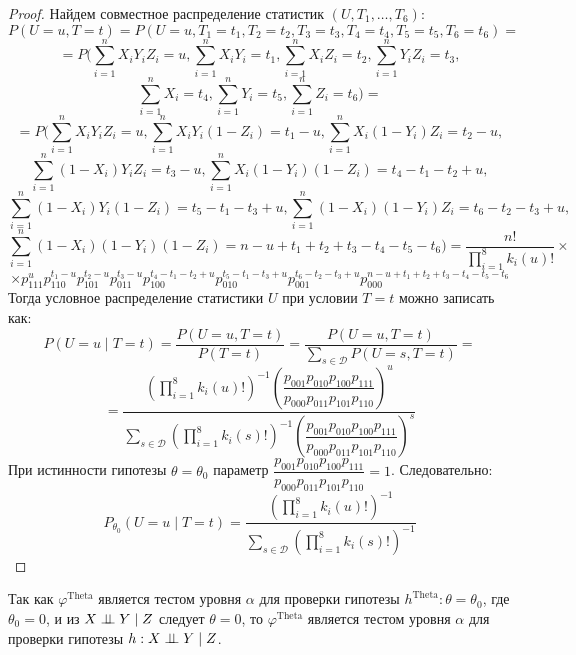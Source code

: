     \begin{proof}
        Найдем совместное распределение статистик $(U,T_1,\ldots,T_6)$:
        $$
            P(U=u,T=t)=P(U=u, T_1=t_1, T_2=t_2, T_3=t_3, T_4=t_4, T_5=t_5, T_6=t_6)=
        $$
        $$
            =P\biggl(\sum_{i=1}^n X_i Y_i Z_i=u, \sum_{i=1}^n X_i Y_i=t_1, \sum_{i=1}^n X_i Z_i=t_2,\sum_{i=1}^n Y_i Z_i=t_3,
            $$
            $$
            \sum_{i=1}^n X_i=t_4,\sum_{i=1}^n Y_i=t_5, \sum_{i=1}^n Z_i=t_6\biggr)=
        $$
        $$
            =P\biggl(\sum_{i=1}^n X_i Y_i Z_i=u, \sum_{i=1}^n X_i Y_i (1- Z_i)=t_1-u, \sum_{i=1}^n X_i (1-Y_i) Z_i=t_2-u,
        $$
        $$
            \sum_{i=1}^n (1-X_i) Y_i Z_i=t_3-u,
            \sum_{i=1}^{n} X_i(1-Y_i)(1-Z_i)=t_4-t_1-t_2+u,
        $$
        $$
            \sum_{i=1}^{n} (1-X_i)Y_i(1-Z_i)=t_5-t_1-t_3+u,
            \sum_{i=1}^{n} (1-X_i)(1-Y_i)Z_i = t_6 - t_2 - t_3 + u,
        $$
        $$
            \sum_{i=1}^n (1-X_i)(1-Y_i)(1-Z_i)=n-u+t_1+t_2+t_3-t_4-t_5-t_6\biggr)
            = \frac{n!}{\prod_{i=1}^8 k_i(u)!} \times
        $$
        $$    
        \times p_{111}^u p_{110}^{t_1-u} p_{101}^{t_2-u} p_{011}^{t_3-u}
            p_{100}^{t_4-t_1-t_2+u} p_{010}^{t_5-t_1-t_3+u} p_{001}^{t_6 - t_2 - t_3 + u} 
            p_{000}^{n-u+t_1+t_2+t_3-t_4-t_5-t_6}
            $$
        Тогда условное распределение статистики $U$ при условии $T=t$ можно записать как:
        $$P(U=u \mid T=t)=\dfrac{P(U=u,T=t)}{P(T=t)}=
        \dfrac{P(U=u,T=t)}{\sum_{s \in \mathcal{D}} P(U=s,T=t)}=
        $$
        $$
        =\dfrac{(\prod_{i=1}^8 k_i(u)!)^{-1} \left(\dfrac{p_{001}p_{010}p_{100}p_{111}}{p_{000}p_{011}p_{101}p_{110}}\right)^u}
            {\sum_{s\in \mathcal{D}} (\prod_{i=1}^8 k_i(s)!)^{-1} \left(\dfrac{p_{001}p_{010}p_{100}p_{111}}{p_{000}p_{011}p_{101}p_{110}}\right)^s}$$
        При истинности гипотезы $\theta=\theta_0$ параметр $\dfrac{p_{001}p_{010}p_{100}p_{111}}{p_{000}p_{011}p_{101}p_{110}}=1$. Следовательно:
        $$P_{\theta_0}(U=u \mid T=t)=\dfrac{(\prod_{i=1}^8 k_i(u)!)^{-1}}
            {\sum_{s\in \mathcal{D}} (\prod_{i=1}^8 k_i(s)!)^{-1}}$$
    \end{proof}
    Так как $\varphi^{\text{Theta}}$ является тестом уровня
    $\alpha$ для проверки гипотезы $h^{\text{Theta}}: \theta=\theta_0$, где $\theta_0=0$,
    и из $X \perp\!\!\!\perp Y \mid Z$ следует $\theta=0$, то 
    $\varphi^{\text{Theta}}$ является тестом уровня $\alpha$ для проверки
    гипотезы $h: X \perp\!\!\!\perp Y \mid Z$.
